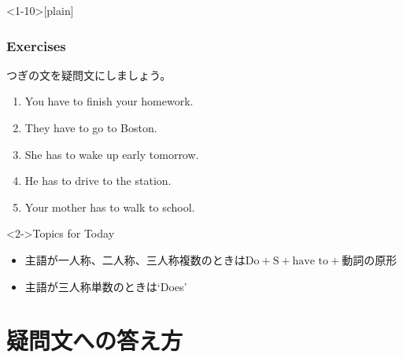 \documentclass[aspectratio=169,xcolor={dvipsnames,table}]{beamer}
\begin{document}
\begin{frame}<1-10>[plain]\frametitle{Exercises}

つぎの文を疑問文にしましょう。

 \begin{enumerate}
  \item<1-> You have to finish your homework.\\
  \item<1-> They have to go to Boston.\hspace{37.5pt}%
  \item<1-> She has to wake up early tomorrow.\hspace{12pt}%
  \item<1-> He has to drive to the station.\hspace{12pt}%
  \item<1-> Your mother has to walk to school.\\
 \end{enumerate}

\begin{exampleblock}<2->{Topics for Today}
\begin{itemize}\small
 \item<3->   主語が一人称、二人称、三人称複数のときは$\text{Do} + \text{S} + \text{have to} + \text{動詞の原形}$\pause
 \item<4->   主語が三人称単数のときは`Does'
\end{itemize}
\end{exampleblock}

\end{frame}


\section{疑問文への答え方}
\end{document}
